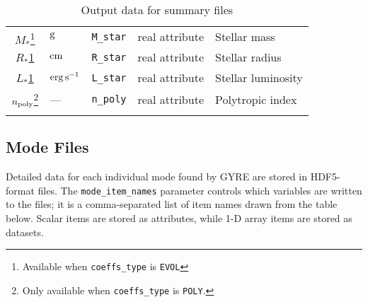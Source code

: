 \documentclass{article}
\newcommand{\Rstar}{\ensuremath{R_{\ast}}}
\newcommand{\Mstar}{\ensuremath{M_{\ast}}}
\newcommand{\Lstar}{\ensuremath{L_{\ast}}}
\newcommand{\cm}{\ensuremath{{\rm cm}}}
\newcommand{\gram}{\ensuremath{{\rm g}}}
\newcommand{\second}{\ensuremath{{\rm s}}}
\newcommand{\erg}{\ensuremath{{\rm erg}}}
\begin{document}
\begin{center}
\begin{longtable}{cllll}
\Mstar\footnote{%
\label{foot:coeffs-evol}
Available when \texttt{coeffs\_type} is \texttt{EVOL}} & 
\gram & \texttt{M\_star} & real attribute & Stellar mass \\
\Rstar\cref{foot:coeffs-evol} & \cm & \texttt{R\_star} & real attribute & Stellar radius \\
\Lstar\cref{foot:coeffs-evol} & $\erg\,\second^{-1}$ & \texttt{L\_star} & real attribute & Stellar luminosity \\
$n_{\rm poly}$\footnote{%
\label{foot:coeffs-poly}
Only available when \texttt{coeffs\_type} is \texttt{POLY}.} & 
--- & \texttt{n\_poly} & real attribute & Polytropic index \\ \hline
\caption{Output data for summary files}
\end{longtable}
\end{center}

\newpage

\subsection*{Mode Files}

Detailed data for each individual mode found by GYRE are stored in HDF5-format
files. The \texttt{mode\_item\_names} parameter controls which variables
are written to the files; it is a comma-separated list of item names
drawn from the table below. Scalar items are stored as attributes,
while 1-D array items are stored as datasets.
\end{document}
